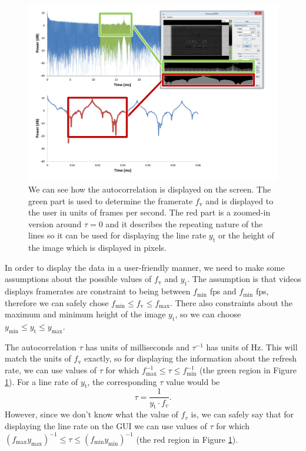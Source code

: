 \documentclass[a4paper,12pt,twoside,openright]{report}
\begin{document}
\begin{figure}[h]
\centering
\includegraphics[width=1\textwidth]{autocorr_compare}
\caption{We can see how the autocorrelation is displayed on the screen. The green part is used to determine the framerate $f_\text{v}$ and is displayed to the user in units of frames per second. The red part is a zoomed-in version around $\tau = 0$ and it describes the repeating nature of the lines so it can be used for displaying the line rate $y_\text{t}$ or the height of the image which is displayed in pixels.}
\label{fig:autocorr_gui}
\end{figure}

In order to display the data in a user-friendly manner, we need to make some assumptions about the possible values of $f_\text{v}$ and $y_\text{t}$. The assumption is that videos displays framerates are constraint to being between $f_\text{min}$ fps and $f_\text{min}$ fps, therefore we can safely chose $f_\text{min} \leq f_\text{v} \leq f_\text{max}$. There also constraints about the maximum and minimum height of the image $y_\text{t}$, so we can choose $y_\text{min} \leq y_\text{t} \leq y_\text{max}$.

The autocorrelation $\tau$ has units of milliseconds and $\tau^{-1}$ has units of Hz. This will match the units of $f_\text{v}$ exactly, so for displaying the information about the refresh rate, we can use values of $\tau$ for which $f^{-1}_\text{max} \leq \tau \leq f^{-1}_\text{min}$ (the green region in Figure \ref{fig:autocorr_gui}). For a line rate of $y_\text{t}$, the corresponding $\tau$ value would be
$$ \tau = \frac{1}{y_\text{t} \cdot f_{v}} .$$
However, since we don't know what the value of $f_{v}$ is, we can safely say that for displaying the line rate on the GUI we can use values of $\tau$ for which $\left( f_\text{max} y_\text{max} \right)^{-1} \leq \tau \leq \left( f_\text{min} y_\text{min} \right)^{-1}$ (the red region in Figure \ref{fig:autocorr_gui}). 
\end{document}
